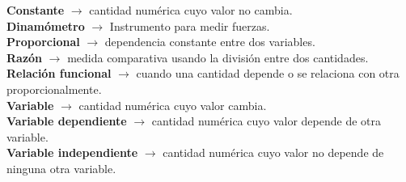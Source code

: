 \begin{defcard}
    \textbf{Constante} $\rightarrow$ cantidad numérica cuyo valor no cambia.\\
    \textbf{Dinamómetro} $\rightarrow$ Instrumento para medir fuerzas.\\
    \textbf{Proporcional} $\rightarrow$ dependencia constante entre dos variables.\\
    \textbf{Razón} $\rightarrow$ medida comparativa usando la división entre dos cantidades.\\
    \textbf{Relación funcional} $\rightarrow$ cuando una cantidad depende o se relaciona con otra proporcionalmente.\\
    \textbf{Variable} $\rightarrow$ cantidad numérica cuyo valor cambia.\\
    \textbf{Variable dependiente} $\rightarrow$ cantidad numérica cuyo valor depende de otra variable.\\
    \textbf{Variable independiente} $\rightarrow$ cantidad numérica cuyo valor no depende de ninguna otra variable.
\end{defcard}